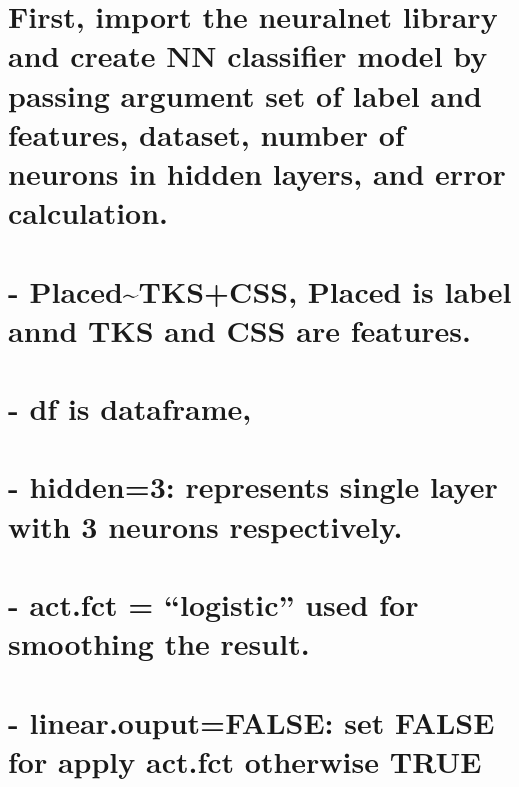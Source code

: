 \documentclass[
]{article}
\begin{document}
\hypertarget{first-import-the-neuralnet-library-and-create-nn-classifier-model-by-passing-argument-set-of-label-and-features-dataset-number-of-neurons-in-hidden-layers-and-error-calculation.}{%
\section{First, import the neuralnet library and create NN classifier
model by passing argument set of label and features, dataset, number of
neurons in hidden layers, and error
calculation.}\label{first-import-the-neuralnet-library-and-create-nn-classifier-model-by-passing-argument-set-of-label-and-features-dataset-number-of-neurons-in-hidden-layers-and-error-calculation.}}

\hypertarget{placedtkscss-placed-is-label-annd-tks-and-css-are-features.}{%
\section{- Placed\textasciitilde TKS+CSS, Placed is label annd TKS and
CSS are
features.}\label{placedtkscss-placed-is-label-annd-tks-and-css-are-features.}}

\hypertarget{df-is-dataframe}{%
\section{- df is dataframe,}\label{df-is-dataframe}}

\hypertarget{hidden3-represents-single-layer-with-3-neurons-respectively.}{%
\section{- hidden=3: represents single layer with 3 neurons
respectively.}\label{hidden3-represents-single-layer-with-3-neurons-respectively.}}

\hypertarget{act.fct-logistic-used-for-smoothing-the-result.}{%
\section{- act.fct = ``logistic'' used for smoothing the
result.}\label{act.fct-logistic-used-for-smoothing-the-result.}}

\hypertarget{linear.ouputfalse-set-false-for-apply-act.fct-otherwise-true}{%
\section{- linear.ouput=FALSE: set FALSE for apply act.fct otherwise
TRUE}\label{linear.ouputfalse-set-false-for-apply-act.fct-otherwise-true}}
\end{document}
